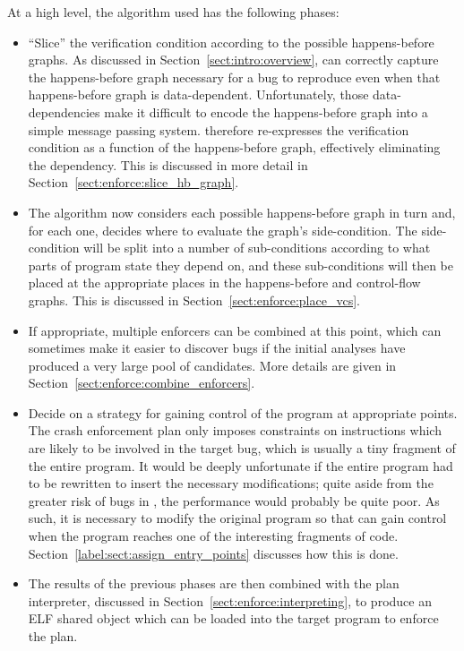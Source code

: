 At a high level, the algorithm used has the following phases:

\begin{itemize}
\item
  ``Slice'' the verification condition according to the possible
  happens-before graphs. As discussed in
  Section~\ref{sect:intro:overview}, {\technique} can correctly
  capture the happens-before graph necessary for a bug to reproduce
  even when that happens-before graph is data-dependent.
  Unfortunately, those data-dependencies make it difficult to encode
  the happens-before graph into a simple message passing system.
  {\Technique} therefore re-expresses the verification condition as a
  function of the happens-before graph, effectively eliminating the
  dependency.  This is discussed in more detail in
  Section~\ref{sect:enforce:slice_hb_graph}.
\item
  The algorithm now considers each possible happens-before graph in
  turn and, for each one, decides where to evaluate the graph's
  side-condition.  The side-condition will be split into a number of
  sub-conditions according to what parts of program state they depend
  on, and these sub-conditions will then be placed at the appropriate
  places in the happens-before and control-flow graphs.  This is
  discussed in Section~\ref{sect:enforce:place_vcs}.
\item
  If appropriate, multiple enforcers can be combined at this point,
  which can sometimes make it easier to discover bugs if the initial
  analyses have produced a very large pool of candidates.  More
  details are given in Section~\ref{sect:enforce:combine_enforcers}.
\item
  Decide on a strategy for gaining control of the program at
  appropriate points.  The crash enforcement plan only imposes
  constraints on instructions which are likely to be involved in the
  target bug, which is usually a tiny fragment of the entire program.
  It would be deeply unfortunate if the entire program had to be
  rewritten to insert the necessary modifications; quite aside from
  the greater risk of bugs in {\implementation}, the performance would
  probably be quite poor.  As such, it is necessary to modify the
  original program so that {\technique} can gain control when the
  program reaches one of the interesting fragments of code.
  Section~\ref{label:sect:assign_entry_points} discusses how this is
  done.

\item
  The results of the previous phases are then combined with the plan
  interpreter, discussed in Section~\ref{sect:enforce:interpreting},
  to produce an ELF shared object which can be loaded into the target
  program to enforce the plan.
\end{itemize}

